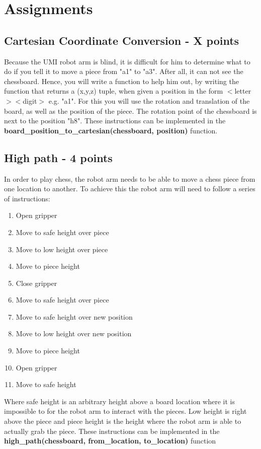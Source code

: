\documentclass{article}
\begin{document}
\section{Assignments}

\subsection*{Cartesian Coordinate Conversion - X points}
Because the UMI robot arm is blind, it is difficult for him to determine what to do if you tell it to move a piece from "a1" to "a3". After all, it can not see the chessboard. Hence, you will write a function to help him out, by writing the function that returns a (x,y,z) tuple, when given a position in the form $<$letter$><$digit$>$ e.g. "a1". For this you will use the rotation and translation of the board, as well as the position of the piece. The rotation point of the chessboard is next to the position "h8". These instructions can be implemented in the \textbf{board\_position\_to\_cartesian(chessboard, position)} function.

\subsection*{High path - 4 points}
In order to play chess, the robot arm needs to be able to move a chess piece from one location to another. To achieve this the robot arm will need to follow a series of instructions:
\begin{enumerate}
\item Open gripper
\item Move to safe height over piece
\item Move to low height over piece
\item Move to piece height
\item Close gripper
\item Move to safe height over piece
\item Move to safe height over new position
\item Move to low height over new position
\item Move to piece height
\item Open gripper
\item Move to safe height
\end{enumerate}
Where safe height is an arbitrary height above a board location where it is impossible to for the robot arm to interact with the pieces. Low height is right above the piece and piece height is the height where the robot arm is able to actually grab the piece. These instructions can be implemented in the \textbf{high\_path(chessboard, from\_location, to\_location)} function
\end{document}

